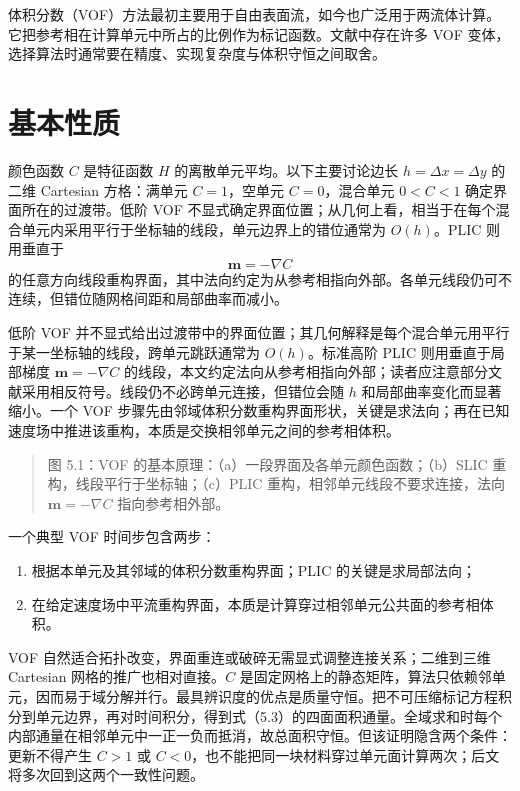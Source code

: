 \documentclass[11pt,a4paper,openany,fontset=none]{ctexbook}
\begin{document}
体积分数（VOF）方法最初主要用于自由表面流，如今也广泛用于两流体计算。它把参考相在计算单元中所占的比例作为标记函数。文献中存在许多 VOF 变体，选择算法时通常要在精度、实现复杂度与体积守恒之间取舍。

\section{基本性质}

颜色函数 $C$ 是特征函数 $H$ 的离散单元平均。以下主要讨论边长 $h=\Delta x=\Delta y$ 的二维 Cartesian 方格：满单元 $C=1$，空单元 $C=0$，混合单元 $0<C<1$ 确定界面所在的过渡带。低阶 VOF 不显式确定界面位置；从几何上看，相当于在每个混合单元内采用平行于坐标轴的线段，单元边界上的错位通常为 $O(h)$。PLIC 则用垂直于
\[
\bm m=-\nabla C
\]
的任意方向线段重构界面，其中法向约定为从参考相指向外部。各单元线段仍可不连续，但错位随网格间距和局部曲率而减小。

低阶 VOF 并不显式给出过渡带中的界面位置；其几何解释是每个混合单元用平行于某一坐标轴的线段，跨单元跳跃通常为 $O(h)$。标准高阶 PLIC 则用垂直于局部梯度 $\bm m=-\nabla C$ 的线段，本文约定法向从参考相指向外部；读者应注意部分文献采用相反符号。线段仍不必跨单元连接，但错位会随 $h$ 和局部曲率变化而显著缩小。一个 VOF 步骤先由邻域体积分数重构界面形状，关键是求法向；再在已知速度场中推进该重构，本质是交换相邻单元之间的参考相体积。

\begin{quote}\small 图 5.1：VOF 的基本原理：（a）一段界面及各单元颜色函数；（b）SLIC 重构，线段平行于坐标轴；（c）PLIC 重构，相邻单元线段不要求连接，法向 $\bm m=-\nabla C$ 指向参考相外部。\end{quote}
一个典型 VOF 时间步包含两步：
\begin{enumerate}[label=(\roman*)]
\item 根据本单元及其邻域的体积分数重构界面；PLIC 的关键是求局部法向；
\item 在给定速度场中平流重构界面，本质是计算穿过相邻单元公共面的参考相体积。
\end{enumerate}
VOF 自然适合拓扑改变，界面重连或破碎无需显式调整连接关系；二维到三维 Cartesian 网格的推广也相对直接。$C$ 是固定网格上的静态矩阵，算法只依赖邻单元，因而易于域分解并行。最具辨识度的优点是质量守恒。把不可压缩标记方程积分到单元边界，再对时间积分，得到式（5.3）的四面面积通量。全域求和时每个内部通量在相邻单元中一正一负而抵消，故总面积守恒。但该证明隐含两个条件：更新不得产生 $C>1$ 或 $C<0$，也不能把同一块材料穿过单元面计算两次；后文将多次回到这两个一致性问题。
\end{document}
